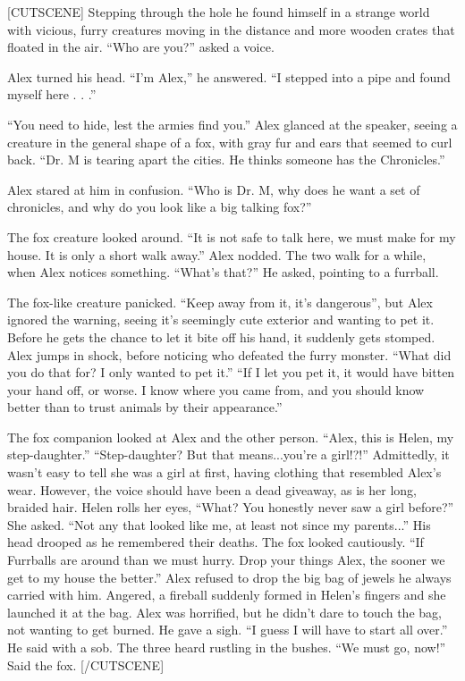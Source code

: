 \documentclass{gd-document}
\begin{document}
[CUTSCENE] Stepping through the hole he found himself in a strange
world with vicious, furry creatures moving in the distance and more
wooden crates that floated in the air.  “Who are you?” asked a voice.

Alex turned his head. “I'm Alex,” he answered. “I stepped into a pipe
and found myself here . . .”

“You need to hide, lest the armies find you.” Alex glanced at the
speaker, seeing a creature in the general shape of a fox, with gray
fur and ears that seemed to curl back. “Dr. M is tearing apart the
cities. He thinks someone has the Chronicles.”

Alex stared at him in confusion. “Who is Dr. M, why does he want a set
of chronicles, and why do you look like a big talking fox?”

The fox creature looked around. “It is not safe to talk here, we must
make for my house. It is only a short walk away.” Alex nodded. The two
walk for a while, when Alex notices something. “What's that?” He
asked, pointing to a furrball.

The fox-like creature panicked. “Keep away from it, it's dangerous”,
but Alex ignored the warning, seeing it's seemingly cute exterior and
wanting to pet it. Before he gets the chance to let it bite off his
hand, it suddenly gets stomped. Alex jumps in shock, before noticing
who defeated the furry monster. “What did you do that for? I only
wanted to pet it.” “If I let you pet it, it would have bitten your
hand off, or worse. I know where you came from, and you should know
better than to trust animals by their appearance.”

The fox companion looked at Alex and the other person. “Alex, this is
Helen, my step-daughter.” “Step-daughter? But that means...you're a
girl!?!” Admittedly, it wasn't easy to tell she was a girl at first,
having clothing that resembled Alex's wear. However, the voice should
have been a dead giveaway, as is her long, braided hair. Helen rolls
her eyes, “What? You honestly never saw a girl before?” She
asked. “Not any that looked like me, at least not since my parents...”
His head drooped as he remembered their deaths. The fox looked
cautiously. “If Furrballs are around than we must hurry. Drop your
things Alex, the sooner we get to my house the better.” Alex refused
to drop the big bag of jewels he always carried with him. Angered, a
fireball suddenly formed in Helen's fingers and she launched it at the
bag. Alex was horrified, but he didn't dare to touch the bag, not
wanting to get burned. He gave a sigh. “I guess I will have to start
all over.” He said with a sob. The three heard rustling in the
bushes. “We must go, now!” Said the fox. [/CUTSCENE]
\end{document}

